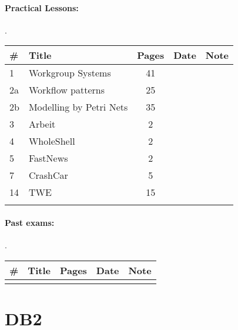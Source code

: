 \documentclass[a4paper,12pt]{article} %
\begin{document}
\paragraph{Practical Lessons:}.\\
\begin{tabularx}{\textwidth}{|l|X|c|l|c|}
	\hline
	\# & Title & Pages & Date & Note \\
	\hline
	1 & Workgroup Systems & 41 &  &  \\
	\hline
	2a & Workflow patterns & 25 &  &  \\
	\hline
	2b & Modelling by Petri Nets & 35 &  &  \\
	\hline
	3 & Arbeit & 2 &  &  \\
	\hline
	4 & WholeShell & 2 &  &  \\
	\hline
	5 & FastNews & 2 &  &  \\
	\hline
	7 & CrashCar & 5 &  &  \\
	\hline
	14 & TWE & 15 &  &  \\
	\hline
	&  &  &  &  \\
	\hline
\end{tabularx}

\paragraph{Past exams:}.\\
\begin{tabularx}{\textwidth}{|l|X|c|l|c|}
	\hline
	\# & Title & Pages & Date & Note \\
	\hline
	&  &  &  &  \\
	\hline
\end{tabularx}

\newpage
\section{DB2}
\end{document}

